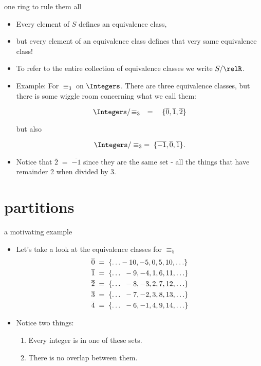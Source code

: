 \documentclass[handout,landscape]{beamer}
\begin{document}
\begin{frame}{one ring to rule them all}
\begin{itemize}
\item Every element of $S$ defines an equivalence class, \pause
\item but every element of an equivalence class defines that very same equivalence class!\pause
\item To refer to the entire collection of equivalence classes we write $S/\relR$. \pause
\item Example: For $\equiv_3$ on $\Integers$. There are three equivalence classes, but there is some wiggle room concerning what we call them:
\pause

\[ \Integers /\!\equiv_3 \quad = \quad \{ \overline{0}, \overline{1}, \overline{2} \} \]

\pause

but also

\[ \Integers / \equiv_3 \; = \; \{ \overline{-1}, \overline{0}, \overline{1} \}. \]

\pause

\item Notice that $\overline{2} \; = \;\overline{-1}$ since they are the same set - all the things that have remainder 2 when divided by 3. 
\end{itemize}
\end{frame}
  
\section{partitions}

\begin{frame}{a motivating example}
\begin{itemize}
\item Let's take a look at the equivalence classes for $\equiv_5$ \pause
\begin{align*}
 \overline{0} \; &= \; \{ \ldots -10, -5, 0, 5, 10, \ldots \} \\
 \overline{1} \; &= \; \{ \ldots \rule{4pt}{0pt} -9, -4, 1, 6, 11, \ldots \} \\
 \overline{2} \; &= \; \{ \ldots \rule{4pt}{0pt}-8, -3, 2, 7, 12, \ldots \} \\
 \overline{3} \; &= \; \{ \ldots \rule{4pt}{0pt}-7, -2, 3, 8, 13, \ldots \} \\
 \overline{4} \; &= \; \{ \ldots \rule{4pt}{0pt}-6, -1, 4, 9, 14, \ldots \} \\
 \end{align*}
 \pause
\item Notice two things: 
\begin{enumerate}
  \item Every integer is in one of these sets.
  \item There is no overlap between them.
\end{enumerate}
\end{itemize}
\end{frame}
\end{document}
